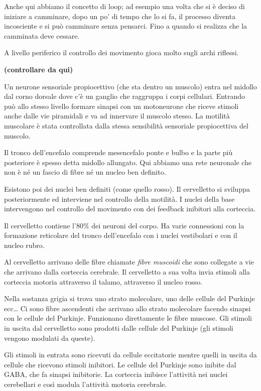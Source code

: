 \documentclass[]{article}
\begin{document}
Anche qui abbiamo il concetto di loop; ad esempio una volta che si è
deciso di iniziare a camminare, dopo un po' di tempo che lo si fa, il
processo diventa incosciente e si può camminare senza pensarci. Fino a
quando si realizza che la camminata deve cessare.

A livello periferico il controllo dei movimento gioca molto sugli archi
riflessi.

\textbf{(controllare da qui)}

Un neurone sensoriale propiocettivo (che sta dentro un muscolo) entra
nel midollo dal corno dorsale dove c'è un ganglio che raggruppa i corpi
cellulari. Entrando può allo stesso livello formare sinapsi con un
motoneurone che riceve stimoli anche dalle vie piramidali e va ad
innervare il muscolo stesso. La motilità muscolare è stata controllata
dalla stessa sensibilità sensoriale propiocettiva del muscolo.

Il tronco dell'encefalo comprende mesencefalo ponte e bulbo e la parte
più posteriore è spesso detta midollo allungato. Qui abbiamo una rete
neuronale che non è né un fascio di fibre né un nucleo ben definito.

Esistono poi dei nuclei ben definiti (come quello rosso). Il cervelletto
si sviluppa posteriormente ed interviene nel controllo della motilità. I
nuclei della base intervengono nel controllo del movimento con dei
feedback inibitori alla corteccia.

Il cervelletto contiene l'80\% dei neuroni del corpo. Ha varie
connessioni con la formazione reticolare del tronco dell'encefalo con i
nuclei vestibolari e con il nucleo rubro.

Al cervelletto arrivano delle fibre chiamate \emph{fibre muscoidi} che
sono collegate a vie che arrivano dalla corteccia cerebrale. Il
cervelletto a sua volta invia stimoli alla corteccia motoria attraverso
il talamo, attraverso il nucleo rosso.

Nella sostanza grigia si trova uno strato molecolare, uno delle cellule
del Purkinje ecc\ldots{} Ci sono fibre ascendenti che arrivano allo
strato molecolare facendo sinapsi con le cellule del Purkinje.
Funzionano direttamente le fibre muscose. Gli stimoli in uscita dal
cervelletto sono prodotti dalle cellule del Purkinje (gli stimoli
vengono modulati da queste).

Gli stimoli in entrata sono ricevuti da cellule eccitatorie mentre
quelli in uscita da cellule che ricevono stimoli inibitori. Le cellule
del Purkinje sono inibite dal GABA, che fa sinapsi inibitorie. La
corteccia inibisce l'attività nei nuclei cerebellari e così modula
l'attività motoria cerebrale.
\end{document}
